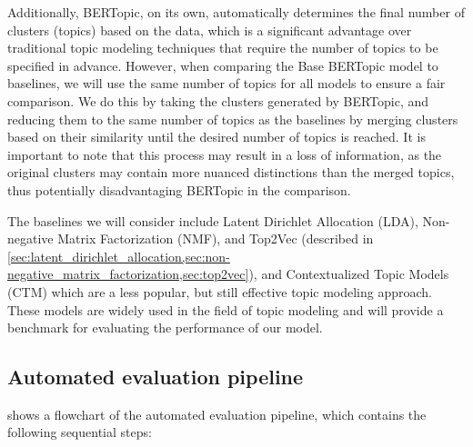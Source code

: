 Additionally, BERTopic, on its own, automatically determines the final number of clusters (topics) based on the data, which is a significant advantage over traditional topic modeling techniques that require the number of topics to be specified in advance. However, when comparing the Base BERTopic model to baselines, we will use the same number of topics for all models to ensure a fair comparison. We do this by taking the clusters generated by BERTopic, and reducing them to the same number of topics as the baselines by merging clusters based on their similarity until the desired number of topics is reached. It is important to note that this process may result in a loss of information, as the original clusters may contain more nuanced distinctions than the merged topics, thus potentially disadvantaging BERTopic in the comparison.

The baselines we will consider include Latent Dirichlet Allocation (LDA), Non-negative Matrix Factorization (NMF), and Top2Vec (described in \cref{sec:latent_dirichlet_allocation,sec:non-negative_matrix_factorization,sec:top2vec}), and Contextualized Topic Models (CTM) \cite{bianchi_pre-training_2021, bianchi_cross-lingual_2021} which are a less popular, but still effective topic modeling approach. These models are widely used in the field of topic modeling and will provide a benchmark for evaluating the performance of our model.

\subsection{Automated evaluation pipeline}

 shows a flowchart of the automated evaluation pipeline, which contains the following sequential steps:

